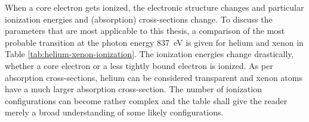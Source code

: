 When a core electron gets ionized, the electronic structure changes and particular ionization energies and (absorption) cross-sections change. To discuss the parameters that are most applicable to this thesis, a comparison of the most probable transition at the photon energy \SI{837}{\electronvolt} is given for helium and xenon in Table \ref{tab:helium-xenon-ionization}. The ionization energies change drastically, whether a core electron or a less tightly bound electron is ionized. As per absorption cross-sections, helium can be considered transparent and xenon atoms have a much larger absorption cross-section. The number of ionization configurations can become rather complex and the table shall give the reader merely a broad understanding of some likely configurations.\\[1\baselineskip]
